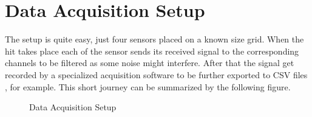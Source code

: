 \section{Data Acquisition Setup}

The setup is quite easy, just four sensors placed on a known size grid.
When the hit takes place each of the sensor sends its received signal to
the corresponding channels to be filtered as some noise might interfere.
After that the signal get recorded by a specialized acquisition software
to be further exported to CSV files , for example. This short journey
can be summarized by the following figure.

    \begin{figure}[htbp]
        \centering
        \scalebox{0.9}{}
        \caption{Data Acquisition Setup }
        \label{fig:label}
    \end{figure}


